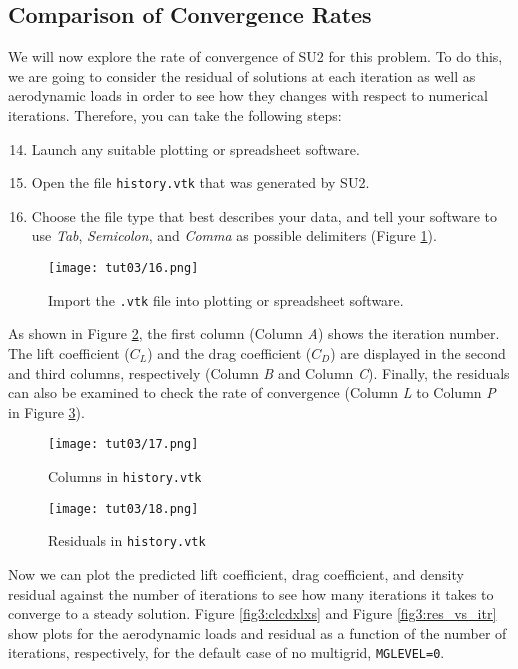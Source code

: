 \subsection{Comparison of Convergence Rates}
We will now explore the rate of convergence of SU2 for this problem. To do this, we are going to consider the residual of solutions at each iteration as well as aerodynamic loads in order to see how they changes with respect to numerical iterations. Therefore, you can take the following steps:
\begin{enumerate}[label=\arabic*)]
	\setcounter{enumi}{13}
	\item Launch any suitable plotting or spreadsheet software.
	\item Open the file \texttt{history.vtk} that was generated by SU2.
	\item Choose the file type that best describes your data, and tell your software to use \textit{Tab}, \textit{Semicolon}, and \textit{Comma} as possible delimiters (Figure \ref{fig3:importvtkxlxs}).
\end{enumerate} 
\begin{figure}[ht]
    \centering
    \texttt{[image: tut03/16.png]}
    \caption{Import the \texttt{.vtk} file into plotting or spreadsheet software.}
    \label{fig3:importvtkxlxs}
\end{figure}
As shown in Figure \ref{fig3:columnsxlxs}, the first column (Column \textit{A}) shows the iteration number. The lift coefficient ($C_L$) and the drag coefficient ($C_D$) are displayed in the second and third columns, respectively (Column \textit{B} and Column \textit{C}). Finally, the residuals can also be examined to check the rate of convergence (Column \textit{L} to Column \textit{P} in Figure \ref{fig3:residualxlxs}).
\begin{figure}[ht]
    \centering
    \texttt{[image: tut03/17.png]}
    \caption{Columns in \texttt{history.vtk}}
    \label{fig3:columnsxlxs}
\end{figure}
\begin{figure}[H]
    \centering
    \texttt{[image: tut03/18.png]}
    \caption{Residuals in \texttt{history.vtk}}
    \label{fig3:residualxlxs}
\end{figure}
Now we can plot the predicted lift coefficient, drag coefficient, and density residual against the number of iterations to see how many iterations it takes to converge to a steady solution. Figure \ref{fig3:clcdxlxs} and Figure \ref{fig3:res_vs_itr} show plots for the aerodynamic loads and residual as a function of the number of iterations, respectively, for the default case of no multigrid, \texttt{MGLEVEL=0}.
